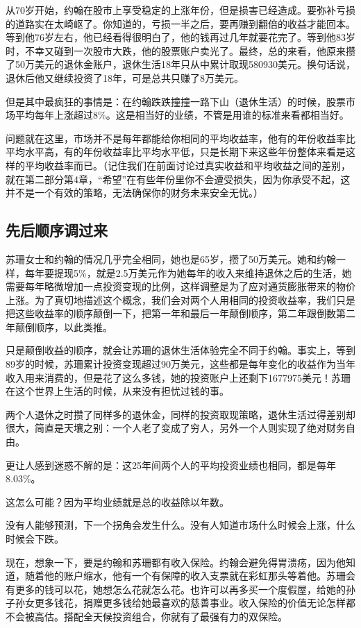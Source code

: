 从70岁开始，约翰在股市上享受稳定的上涨年份，但是损害已经造成。要弥补亏损的道路实在太崎岖了。你知道的，亏损一半之后，要再赚到翻倍的收益才能回本。等到他76岁左右，他已经看得很明白了，他的钱再过几年就要花完了。等到他83岁时，不幸又碰到一次股市大跌，他的股票账户卖光了。最终，总的来看，他原来攒了50万美元的退休金账户，退休生活18年只从中累计取现580930美元。换句话说，退休后他又继续投资了18年，可是总共只赚了8万美元。

但是其中最疯狂的事情是：在约翰跌跌撞撞一路下山（退休生活）的时候，股票市场平均每年上涨超过8\%。这是相当好的业绩，不管是用谁的标准来看都相当好。

问题就在这里，市场并不是每年都能给你相同的平均收益率，他有的年份收益率比平均水平高，有的年份收益率比平均水平低，只是长期下来这些年份整体来看是这样的平均收益率而已。（记住我们在前面讨论过真实收益和平均收益之间的差别，就在第二部分第4章，“希望”在有些年份里你不会遭受损失，因为你承受不起，这并不是一个有效的策略，无法确保你的财务未来安全无忧。）

\subsection{先后顺序调过来}

苏珊女士和约翰的情况几乎完全相同，她也是65岁，攒了50万美元。她和约翰一样，每年要提现5\%，就是2.5万美元作为她每年的收入来维持退休之后的生活，她需要每年略微增加一点投资变现的比例，这样调整是为了应对通货膨胀带来的物价上涨。为了真切地描述这个概念，我们会对两个人用相同的投资收益率，我们只是把这些收益率的顺序颠倒一下，把第一年和最后一年颠倒顺序，第二年跟倒数第二年颠倒顺序，以此类推。

只是颠倒收益的顺序，就会让苏珊的退休生活体验完全不同于约翰。事实上，等到89岁的时候，苏珊累计投资变现超过90万美元，这些都是每年变化的收益作为当年收入用来消费的，但是花了这么多钱，她的投资账户上还剩下1677975美元！苏珊在这个世界上生活的时候，从来没有担忧过钱的事。



两个人退休之时攒了同样多的退休金，同样的投资取现策略，退休生活过得差别却很大，简直是天壤之别：一个人老了变成了穷人，另外一个人则实现了绝对财务自由。

更让人感到迷惑不解的是：这25年间两个人的平均投资业绩也相同，都是每年8.03\%。

这怎么可能？因为平均业绩就是总的收益除以年数。

没有人能够预测，下一个拐角会发生什么。没有人知道市场什么时候会上涨，什么时候会下跌。

现在，想象一下，要是约翰和苏珊都有收入保险。约翰会避免得胃溃疡，因为他知道，随着他的账户缩水，他有一个有保障的收入支票就在彩虹那头等着他。苏珊会有更多的钱可以花，她想怎么花就怎么花。也许可以再多买一个度假屋，给她的孙子孙女更多钱花，捐赠更多钱给她最喜欢的慈善事业。收入保险的价值无论怎样都不会被高估。搭配全天候投资组合，你就有了最强有力的双保险。

